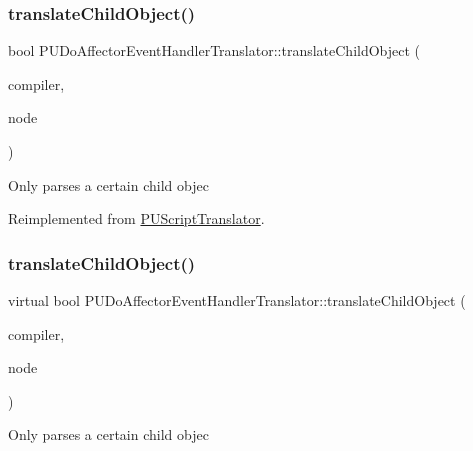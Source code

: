 \subsubsection{\texorpdfstring{translate\+Child\+Object()}{translateChildObject()}\hspace{0.1cm}{\footnotesize\ttfamily [1/2]}}
{\footnotesize\ttfamily bool P\+U\+Do\+Affector\+Event\+Handler\+Translator\+::translate\+Child\+Object (\begin{DoxyParamCaption}\item[{\hyperlink{classPUScriptCompiler}{P\+U\+Script\+Compiler} $\ast$}]{compiler,  }\item[{\hyperlink{classPUAbstractNode}{P\+U\+Abstract\+Node} $\ast$}]{node }\end{DoxyParamCaption})\hspace{0.3cm}{\ttfamily [virtual]}}

Only parses a certain child objec 

Reimplemented from \hyperlink{classPUScriptTranslator_ab587d01348ae3e678cb700c719b2b113}{P\+U\+Script\+Translator}.

\mbox{\label{classPUDoAffectorEventHandlerTranslator_a85adb079a66ea5807ca5fef26dfaa8e2}} 
\subsubsection{\texorpdfstring{translate\+Child\+Object()}{translateChildObject()}\hspace{0.1cm}{\footnotesize\ttfamily [2/2]}}
{\footnotesize\ttfamily virtual bool P\+U\+Do\+Affector\+Event\+Handler\+Translator\+::translate\+Child\+Object (\begin{DoxyParamCaption}\item[{\hyperlink{classPUScriptCompiler}{P\+U\+Script\+Compiler} $\ast$}]{compiler,  }\item[{\hyperlink{classPUAbstractNode}{P\+U\+Abstract\+Node} $\ast$}]{node }\end{DoxyParamCaption})\hspace{0.3cm}{\ttfamily [virtual]}}

Only parses a certain child objec 

